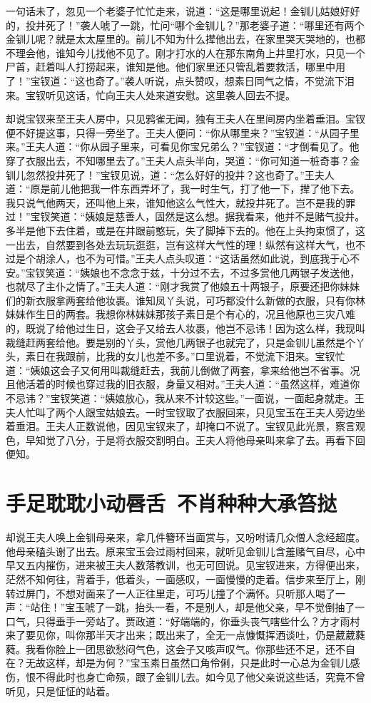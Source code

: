 \documentclass[12pt,oneside]{book}
\begin{document}
一句话未了，忽见一个老婆子忙忙走来，说道：“这是哪里说起！金钏儿姑娘好好的，投井死了！”袭人唬了一跳，忙问“哪个金钏儿？”那老婆子道：“哪里还有两个金钏儿呢？就是太太屋里的。前儿不知为什么撵他出去，在家里哭天哭地的，也都不理会他，谁知今儿找他不见了。刚才打水的人在那东南角上井里打水，只见一个尸首，赶着叫人打捞起来，谁知是他。他们家里还只管乱着要救活，哪里中用了！”宝钗道：“这也奇了。”袭人听说，点头赞叹，想素日同气之情，不觉流下泪来。宝钗听见这话，忙向王夫人处来道安慰。这里袭人回去不提。

却说宝钗来至王夫人房中，只见鸦雀无闻，独有王夫人在里间房内坐着垂泪。宝钗便不好提这事，只得一旁坐了。王夫人便问：“你从哪里来？”宝钗道：“从园子里来。”王夫人道：“你从园子里来，可看见你宝兄弟么？”宝钗道：“才倒看见了。他穿了衣服出去，不知哪里去了。”王夫人点头半向，哭道：“你可知道一桩奇事？金钏儿忽然投井死了！”宝钗见说，道：“怎么好好的投井？这也奇了。”王夫人道：“原是前儿他把我一件东西弄坏了，我一时生气，打了他一下，撵了他下去。我只说气他两天，还叫他上来，谁知他这么气性大，就投井死了。岂不是我的罪过！”宝钗笑道：“姨娘是慈善人，固然是这么想。据我看来，他并不是赌气投井。多半是他下去住着，或是在井跟前憨玩，失了脚掉下去的。他在上头拘束惯了，这一出去，自然要到各处去玩玩逛逛，岂有这样大气性的理！纵然有这样大气，也不过是个胡涂人，也不为可惜。”王夫人点头叹道：“这话虽然如此说，到底我于心不安。”宝钗笑道：“姨娘也不念念于兹，十分过不去，不过多赏他几两银子发送他，也就尽了主仆之情了。”王夫人道：“刚才我赏了他娘五十两银子，原要还把你妹妹们的新衣服拿两套给他妆裹。谁知凤丫头说，可巧都没什么新做的衣服，只有你林妹妹作生日的两套。我想你林妹妹那孩子素日是个有心的，况且他原也三灾八难的，既说了给他过生日，这会子又给去人妆裹，他岂不忌讳！因为这么样，我现叫裁缝赶两套给他。要是别的丫头，赏他几两银子也就完了，只是金钏儿虽然是个丫头，素日在我跟前，比我的女儿也差不多。”口里说着，不觉流下泪来。宝钗忙道：“姨娘这会子又何用叫裁缝赶去，我前儿倒做了两套，拿来给他岂不省事。况且他活着的时候也穿过我的旧衣服，身量又相对。”王夫人道：“虽然这样，难道你不忌讳？”宝钗笑道：“姨娘放心，我从来不计较这些。”一面说，一面起身就走。王夫人忙叫了两个人跟宝姑娘去。一时宝钗取了衣服回来，只见宝玉在王夫人旁边坐着垂泪。王夫人正数说他，因见宝钗来了，却掩口不说了。宝钗见此光景，察言观色，早知觉了八分，于是将衣服交割明白。王夫人将他母亲叫来拿了去。再看下回便知。
 

\chapter{手足耽耽小动唇舌~不肖种种大承笞挞}
却说王夫人唤上金钏母亲来，拿几件簪环当面赏与，又吩咐请几众僧人念经超度。他母亲磕头谢了出去。原来宝玉会过雨村回来，就听见金钏儿含羞赌气自尽，心中早又五内摧伤，进来被王夫人数落教训，也无可回说。见宝钗进来，方得便出来，茫然不知何往，背着手，低着头，一面感叹，一面慢慢的走着。信步来至厅上，刚转过屏门，不想对面来了一人正往里走，可巧儿撞了个满怀。只听那人喝了一声：“站住！”宝玉唬了一跳，抬头一看，不是别人，却是他父亲，早不觉倒抽了一口气，只得垂手一旁站了。贾政道：“好端端的，你垂头丧气嗐些什么？方才雨村来了要见你，叫你那半天才出来；既出来了，全无一点慷慨挥洒谈吐，仍是葳葳蕤蕤。我看你脸上一团思欲愁闷气色，这会子又咳声叹气。你那些还不足，还不自在？无故这样，却是为何？”宝玉素日虽然口角伶俐，只是此时一心总为金钏儿感伤，恨不得此时也身亡命殒，跟了金钏儿去。如今见了他父亲说这些话，究竟不曾听见，只是怔怔的站着。
\end{document}
